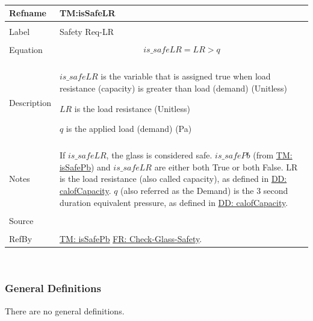 \documentclass[12pt]{article}
\begin{document}
~\newline
\noindent \begin{minipage}{\textwidth}
\begin{tabular}{p{} p{}}
\toprule \textbf{Refname} & \textbf{TM:isSafeLR}
\label{TM:isSafeLR}
\\ \midrule \\
Label & Safety Req-LR
\\ \midrule \\
Equation & \begin{dmath}
           is\_safeLR=LR>q
           \end{dmath}
\\ \midrule \\
Description & \begin{symbDescription}
              \item{$is\_safeLR$ is the variable that is assigned true when load resistance (capacity) is greater than load (demand) (Unitless)}
              \item{$LR$ is the load resistance (Unitless)}
              \item{$q$ is the applied load (demand) (Pa)}
              \end{symbDescription}
\\ \midrule \\
Notes & If $is\_safeLR$, the glass is considered safe. $is\_safePb$ (from \hyperref[TM:isSafePb]{TM: isSafePb}) and $is\_safeLR$ are either both True or both False. LR is the load resistance (also called capacity), as defined in \hyperref[DD:calofCapacity]{DD: calofCapacity}. $q$ (also referred as the Demand) is the 3 second duration equivalent pressure, as defined in \hyperref[DD:calofCapacity]{DD: calofCapacity}.
\\ \midrule \\
Source & \cite{astm2009}
\\ \midrule \\
RefBy & \hyperref[TM:isSafePb]{TM: isSafePb} \hyperref[checkGlassSafety]{FR: Check-Glass-Safety}.
\\ \bottomrule \end{tabular}
\end{minipage}\\
\subsubsection{General Definitions}
\label{Sec:GDs}
There are no general definitions.
\end{document}
